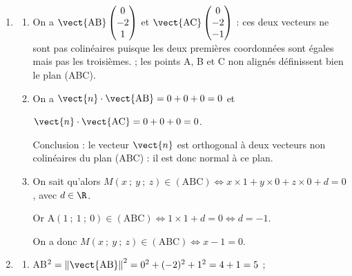 \begin{enumerate}
En remplaçant $t$ par $- 1$ dans les trois équations de $(d)$, on obtient :

$\left\{\begin{array}{l c l}
x &=&1\\
y&=&1 - 2\\
z&=&\phantom{1 + } 1
\end{array}\right.$

On a donc B$(1~;~- 1~;~1) \in (d) \cap \mathcal{P}$.
\item %
	\begin{enumerate}
		\item %
		
		On a $\vect{\text{AB}}\begin{pmatrix}0\\-2\\1\end{pmatrix}$ et $\vect{\text{AC}}\begin{pmatrix}0\\-2\\- 1\end{pmatrix}$ : ces deux vecteurs ne sont pas colinéaires puisque les deux premières coordonnées sont égales mais pas les troisièmes. ; les points A, B et C non alignés définissent bien le plan (ABC).
		\item %
		On a $\vect{n} \cdot \vect{\text{AB}} = 0 + 0 + 0 = 0$ et 
		
$\vect{n} \cdot \vect{\text{AC}} = 0 + 0 + 0 = 0$.

Conclusion : le vecteur $\vect{n}$ est orthogonal à deux vecteurs non colinéaires du plan (ABC) : il est donc normal à ce plan.
		\item %
On sait qu'alors $M(x~;~y~;~z) \in (\text{ABC}) \iff x \times 1 + y\times 0 + z \times 0 + d = 0$, avec $d \in \R$.

Or A$(1~;~1~;~0) \in (\text{ABC}) \iff 1 \times 1 + d = 0  \iff d = - 1$.

On a donc $M(x~;~y~;~z) \in (\text{ABC}) \iff x - 1 = 0$.
	\end{enumerate}
\item 
	\begin{enumerate}
		\item %
AB$^2 = \left\|\vect{\text{AB}}\right\|^2 = 0^2 + (- 2)^2 + 1^2 = 4 + 1 = 5$ ;


\end{enumerate}
\end{enumerate}
